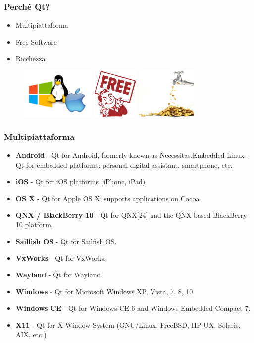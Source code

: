 \documentclass[10pt, aspectratio=169]{beamer}
\begin{document}
\begin{frame}
	\frametitle{Perché Qt?}
	\begin{itemize}
		\item Multipiattaforma
		\item Free Software
		\item Ricchezza
	\end{itemize}
	\begin{figure}
		\includegraphics[height=2.5cm]{images/multiplat.png}
		\qquad
		\includegraphics[height=2.5cm]{images/free.png}
		\qquad
		\includegraphics[height=2.5cm]{images/money.jpg}
	\end{figure}
\end{frame}

\begin{frame}
	\frametitle{Multipiattaforma}
	\begin{itemize}
		\item \textbf{Android} - Qt for Android, formerly known as Necessitas.Embedded Linux - Qt for embedded platforms: personal digital assistant, smartphone,
		etc.
		\item \textbf{iOS} - Qt for iOS platforms (iPhone, iPad)
		\item \textbf{OS X} - Qt for Apple OS X; supports applications on Cocoa
		\item \textbf{QNX / BlackBerry 10} - Qt for QNX[24] and the QNX-based BlackBerry 10 platform.
		\item \textbf{Sailfish OS} - Qt for Sailfish OS.
		\item \textbf{VxWorks} - Qt for VxWorks.
		\item \textbf{Wayland} - Qt for Wayland.
		\item \textbf{Windows} - Qt for Microsoft Windows XP, Vista, 7, 8, 10
		\item \textbf{Windows CE} - Qt for Windows CE 6 and Windows Embedded Compact 7.
		\item \textbf{X11} - Qt for X Window System (GNU/Linux, FreeBSD, HP-UX, Solaris, AIX, etc.)
	\end{itemize}
\end{frame}
\end{document}
